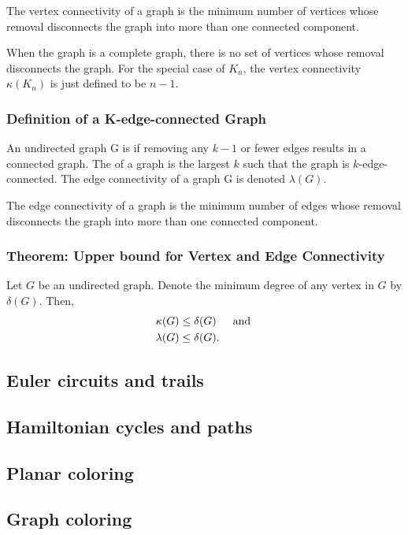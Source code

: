 The vertex connectivity of a graph is the minimum number of vertices whose removal disconnects the graph into more than one connected component.

When the graph is a complete graph, there is no set of vertices whose removal disconnects the graph. For the special case of $K_n$, the vertex connectivity $\kappa(K_n)$ is just defined to be $n - 1$.

\subsubsection*{Definition of a K-edge-connected Graph}
An undirected graph G is  if removing any $k - 1$ or fewer edges results in a connected graph. The  of a graph is the largest $k$ such that the graph is $k$-edge-connected. The edge connectivity of a graph G is denoted $\lambda(G)$.

The edge connectivity of a graph is the minimum number of edges whose removal disconnects the graph into more than one connected component.

\subsubsection*{Theorem: Upper bound for Vertex and Edge Connectivity}
Let $G$ be an undirected graph. Denote the minimum degree of any vertex in $G$ by $\delta(G)$. Then,
\begin{align*}
  \kappa(G)  & \leq \delta(G)~~~\operatorname{~\text{and}~} \\
  \lambda(G) & \leq \delta(G).
\end{align*}

\subsection{Euler circuits and trails}


\subsection{Hamiltonian cycles and paths}


\subsection{Planar coloring}


\subsection{Graph coloring}
